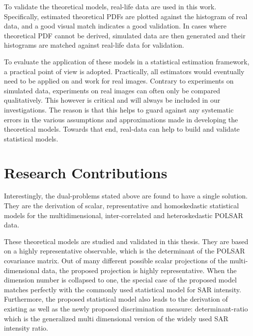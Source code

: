 To validate the theoretical models,  real-life data are used in this work.
Specifically, estimated theoretical PDFs are plotted against the histogram of real data,
  and a good visual match indicates a good validation.
In cases where theoretical PDF cannot be derived, simulated data are then generated
  and their histograms are matched against real-life data for validation.


To evaluate the application of these models in a statistical estimation framework, a practical point of view is adopted.
Practically, all estimators would eventually need to be applied on and work for real images.
Contrary to experiments on simulated data, experiments on real images can often only be compared qualitatively.
This however is critical and will always be included in our investigations.
The reason is that this helps to guard against any systematic errors in the various assumptions and approximations made in developing the theoretical models.
Towards that end, real-data can help to build and validate statistical models.

\section{Research Contributions}
Interestingly, the dual-problems stated above are found to have a single solution.
They are the derivation of scalar, representative and homoskedastic statistical models for the multidimensional, inter-correlated and heteroskedastic POLSAR data.

These theoretical models are studied and validated in this thesis.
They are based on a highly representative observable, which is the determinant of the POLSAR covariance matrix.
Out
                of many different possible scalar projections of the
                multi-dimensional data, the proposed projection is
                highly representative.
When the dimension number is collapsed to one, the
                special case of the proposed model matches perfectly
                with the commonly used statistical model for SAR
                intensity.
Furthermore,
                the proposed statistical model also leads to the
                derivation of existing as well as the newly proposed
                discrimination measure: determinant-ratio which is the
                generalized multi dimensional version of the widely used
                SAR intensity ratio.

